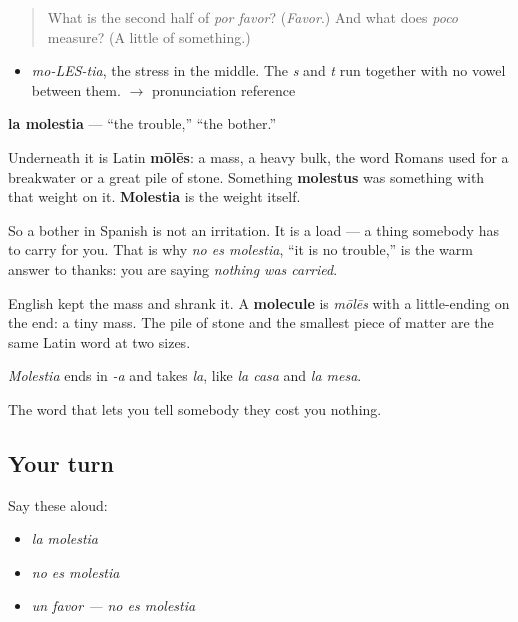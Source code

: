\begin{quote}
What is the second half of \emph{por favor}? (\emph{Favor}.) And what does \emph{poco} measure? (A little of something.)
\end{quote}

\begin{sounds}
\begin{itemize}
\raggedright
  \item \emph{mo-LES-tia}, the stress in the middle. The \emph{s} and \emph{t} run together with no vowel between them. $\to$ pronunciation reference
\end{itemize}
\end{sounds}

\begin{cousinweb}
\textbf{la molestia} — \textquotedblleft{}the trouble,\textquotedblright{} \textquotedblleft{}the bother.\textquotedblright{}

Underneath it is Latin \textbf{mōlēs}: a mass, a heavy bulk, the word Romans used for a breakwater or a great pile of stone. Something \textbf{molestus} was something with that weight on it. \textbf{Molestia} is the weight itself.

So a bother in Spanish is not an irritation. It is a load — a thing somebody has to carry for you. That is why \emph{no es molestia}, \textquotedblleft{}it is no trouble,\textquotedblright{} is the warm answer to thanks: you are saying \emph{nothing was carried}.

English kept the mass and shrank it. A \textbf{molecule} is \emph{mōlēs} with a little-ending on the end: a tiny mass. The pile of stone and the smallest piece of matter are the same Latin word at two sizes.

\emph{Molestia} ends in \emph{-a} and takes \emph{la}, like \emph{la casa} and \emph{la mesa}.
\end{cousinweb}

\begin{grammarlens}[title={What you've built}]
The word that lets you tell somebody they cost you nothing.
\end{grammarlens}

\subsection*{Your turn}
Say these aloud:

\begin{itemize}
\raggedright
  \item \emph{la molestia}
  \item \emph{no es molestia}
  \item \emph{un favor — no es molestia}
\end{itemize}

